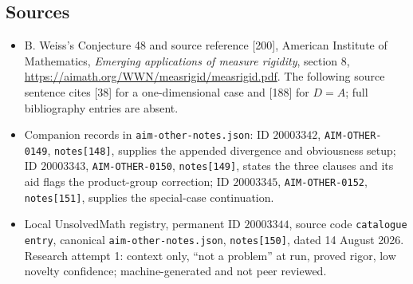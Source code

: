 \documentclass[11pt]{article}
\begin{document}
\subsection{Sources}
\begin{itemize}
\item B. Weiss's Conjecture 48 and source reference [200], American Institute of Mathematics, \emph{Emerging applications of measure rigidity}, section 8, \url{https://aimath.org/WWN/measrigid/measrigid.pdf}. The following source sentence cites [38] for a one-dimensional case and [188] for $D=A$; full bibliography entries are absent.
\item Companion records in \texttt{aim-other-notes.json}: ID $20003342$, \texttt{AIM-OTHER-0149}, \texttt{notes[148]}, supplies the appended divergence and obviousness setup; ID $20003343$, \texttt{AIM-OTHER-0150}, \texttt{notes[149]}, states the three clauses and its aid flags the product-group correction; ID $20003345$, \texttt{AIM-OTHER-0152}, \texttt{notes[151]}, supplies the special-case continuation.
\item Local UnsolvedMath registry, permanent ID $20003344$, source code \texttt{catalogue entry}, canonical \texttt{aim-other-notes.json}, \texttt{notes[150]}, dated 14 August 2026. Research attempt 1: context only, ``not a problem'' at run, proved rigor, low novelty confidence; machine-generated and not peer reviewed.
\end{itemize}
\end{document}

